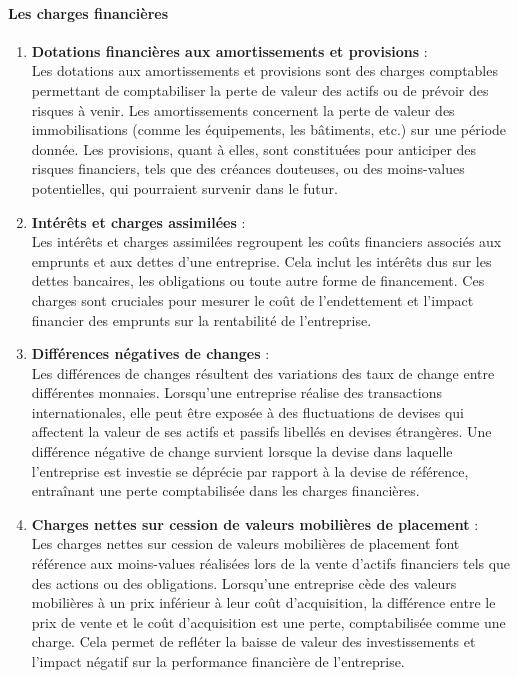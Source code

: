 \documentclass[a4paper, 12pt]{report}
\begin{document}
\paragraph{Les charges financières}

\begin{enumerate}
	\item \textbf{Dotations financières aux amortissements et provisions} :\\
	Les dotations aux amortissements et provisions sont des charges comptables permettant de comptabiliser la perte de valeur des actifs ou de prévoir des risques à venir. Les amortissements concernent la perte de valeur des immobilisations (comme les équipements, les bâtiments, etc.) sur une période donnée. Les provisions, quant à elles, sont constituées pour anticiper des risques financiers, tels que des créances douteuses, ou des moins-values potentielles, qui pourraient survenir dans le futur.
	
	\item \textbf{Intérêts et charges assimilées} :\\
	Les intérêts et charges assimilées regroupent les coûts financiers associés aux emprunts et aux dettes d'une entreprise. Cela inclut les intérêts dus sur les dettes bancaires, les obligations ou toute autre forme de financement. Ces charges sont cruciales pour mesurer le coût de l'endettement et l'impact financier des emprunts sur la rentabilité de l'entreprise.
	
	\item \textbf{Différences négatives de changes} :\\
	Les différences de changes résultent des variations des taux de change entre différentes monnaies. Lorsqu’une entreprise réalise des transactions internationales, elle peut être exposée à des fluctuations de devises qui affectent la valeur de ses actifs et passifs libellés en devises étrangères. Une différence négative de change survient lorsque la devise dans laquelle l'entreprise est investie se déprécie par rapport à la devise de référence, entraînant une perte comptabilisée dans les charges financières.
	
	\item \textbf{Charges nettes sur cession de valeurs mobilières de placement} :\\
	Les charges nettes sur cession de valeurs mobilières de placement font référence aux moins-values réalisées lors de la vente d'actifs financiers tels que des actions ou des obligations. Lorsqu'une entreprise cède des valeurs mobilières à un prix inférieur à leur coût d'acquisition, la différence entre le prix de vente et le coût d'acquisition est une perte, comptabilisée comme une charge. Cela permet de refléter la baisse de valeur des investissements et l'impact négatif sur la performance financière de l'entreprise.
\end{enumerate}
\end{document}

